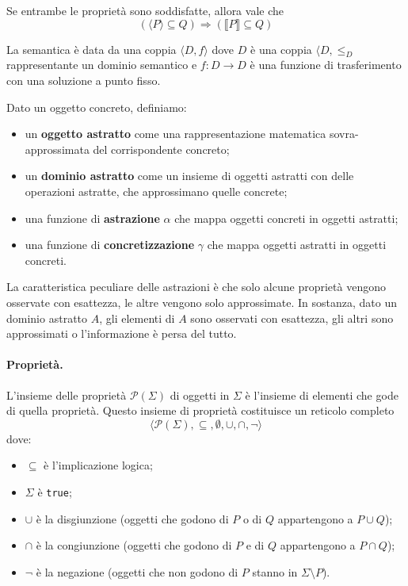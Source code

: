 \documentclass[a4paper, 11pt]{article}
\newcommand{\parts}[1]{\mathcal{P}(#1)}
\begin{document}
	Se entrambe le proprietà sono soddisfatte, allora vale che \[ (\langle P \rangle \subseteq Q) \Rightarrow (\llbracket P \rrbracket \subseteq Q) \]
	
	La semantica è data da una coppia $\langle D, f \rangle$ dove $D$ è una coppia $\langle D, \leq_D$ rappresentante un dominio semantico e $f: D \to D$ è una funzione di trasferimento con una soluzione a punto fisso.
	
	Dato un oggetto concreto, definiamo:
	\begin{itemize}
		\item un \textbf{oggetto astratto} come una rappresentazione matematica sovra-approssimata del corrispondente concreto;
		\item un \textbf{dominio astratto} come un insieme di oggetti astratti con delle operazioni astratte, che approssimano quelle concrete;
		\item una funzione di \textbf{astrazione} $\alpha$ che mappa oggetti concreti in oggetti astratti;
		\item una funzione di \textbf{concretizzazione} $\gamma$ che mappa oggetti astratti in oggetti concreti.
	\end{itemize}
	
	La caratteristica peculiare delle astrazioni è che solo alcune proprietà vengono osservate con esattezza, le altre vengono solo approssimate. In sostanza, dato un dominio astratto $A$, gli elementi di $A$ sono osservati con esattezza, gli altri sono approssimati o l'informazione è persa del tutto.
	
	\paragraph{Proprietà.} L'insieme delle proprietà $\parts{\Sigma}$ di oggetti in $\Sigma$ è l'insieme di elementi che gode di quella proprietà. Questo insieme di proprietà costituisce un reticolo completo \[ \langle \parts{\Sigma}, \subseteq, \emptyset, \cup, \cap, \neg \rangle \] dove:
	\begin{itemize}
		\item $\subseteq$ è l'implicazione logica;
		\item $\Sigma$ è \verb|true|;
		\item $\cup$ è la disgiunzione (oggetti che godono di $P$ o di $Q$ appartengono a $P \cup Q$);
		\item $\cap$ è la congiunzione (oggetti che godono di $P$ e di $Q$ appartengono a $P \cap Q$);
		\item $\neg$ è la negazione (oggetti che non godono di $P$ stanno in $\Sigma \setminus P$).
	\end{itemize}
\end{document}

